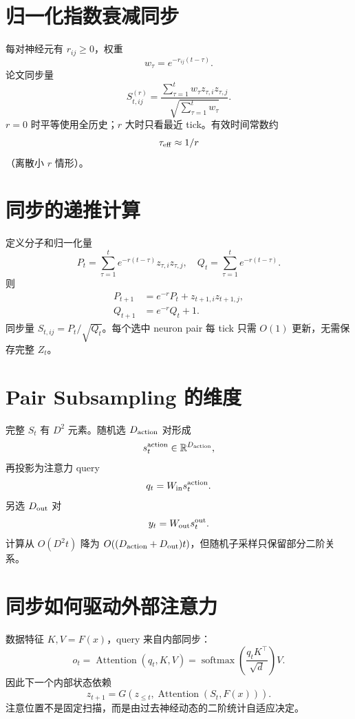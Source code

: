 \documentclass[UTF8,12pt,a4paper,fontset=none]{ctexart}
\numberwithin{equation}{section}
\newcommand{\R}{\mathbb{R}}
\newcommand{\softmax}{\operatorname{softmax}}
\begin{document}
\section{归一化指数衰减同步}
每对神经元有 $r_{ij}\ge0$，权重
\begin{equation}
 w_\tau=e^{-r_{ij}(t-\tau)}.
\end{equation}
论文同步量
\begin{equation}
 \boxed{
 S_{t,ij}^{(r)}=
 \frac{\sum_{\tau=1}^{t}w_\tau z_{\tau,i}z_{\tau,j}}
 {\sqrt{\sum_{\tau=1}^{t}w_\tau}}}.
\end{equation}
$r=0$ 时平等使用全历史；$r$ 大时只看最近 tick。有效时间常数约
\begin{equation}
 \tau_{\rm eff}\approx1/r
\end{equation}
（离散小 $r$ 情形）。

\section{同步的递推计算}
定义分子和归一化量
\begin{equation}
 P_t=\sum_{\tau=1}^{t}e^{-r(t-\tau)}z_{\tau,i}z_{\tau,j},
 \quad Q_t=\sum_{\tau=1}^{t}e^{-r(t-\tau)}.
\end{equation}
则
\begin{align}
 P_{t+1}&=e^{-r}P_t+z_{t+1,i}z_{t+1,j},\\
 Q_{t+1}&=e^{-r}Q_t+1.
\end{align}
同步量 $S_{t,ij}=P_t/\sqrt{Q_t}$。每个选中 neuron pair 每 tick 只需 $O(1)$ 更新，无需保存完整 $Z_t$。

\section{Pair Subsampling 的维度}
完整 $S_t$ 有 $D^2$ 元素。随机选 $D_{\rm action}$ 对形成
\begin{equation}
 s_t^{\rm action}\in\R^{D_{\rm action}},
\end{equation}
再投影为注意力 query
\begin{equation}
 q_t=W_{\rm in}s_t^{\rm action}.
\end{equation}
另选 $D_{\rm out}$ 对
\begin{equation}
 y_t=W_{\rm out}s_t^{\rm out}.
\end{equation}
计算从 $O(D^2t)$ 降为 $O((D_{\rm action}+D_{\rm out})t)$，但随机子采样只保留部分二阶关系。

\section{同步如何驱动外部注意力}
数据特征 $K,V=F(x)$，query 来自内部同步：
\begin{equation}
 o_t=\operatorname{Attention}(q_t,K,V)
 =\softmax\left(\frac{q_tK^\top}{\sqrt d}\right)V.
\end{equation}
因此下一个内部状态依赖
\begin{equation}
 z_{t+1}=G(z_{\le t},\operatorname{Attention}(S_t,F(x))).
\end{equation}
注意位置不是固定扫描，而是由过去神经动态的二阶统计自适应决定。
\end{document}
